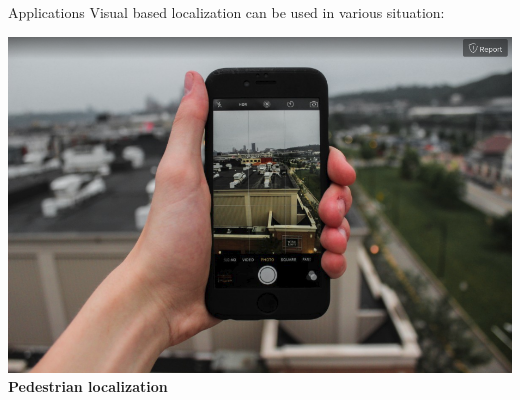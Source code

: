 \begin{frame}{Applications}
	Visual based localization can be used in various situation:
	\vfill
	{\centering
	\begin{minipage}[t]{0.31\linewidth}
		\includegraphics[width=\linewidth]{vect/intro/fig2/urban-loc}
		\vfill
		\textbf<1>{Pedestrian localization}
	\end{minipage}
	}
\end{frame}

